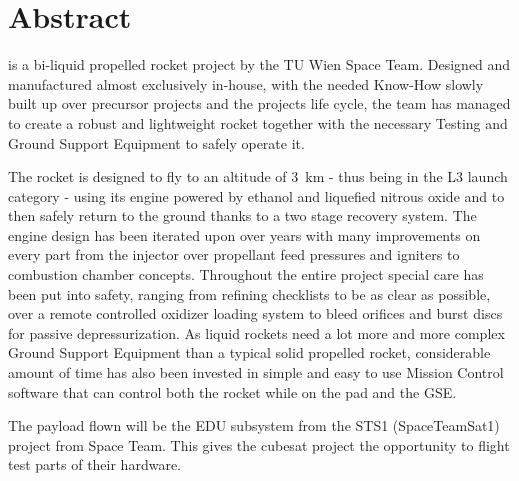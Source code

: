 \chapter{Abstract}
\label{chap:abstract}

\uH is a bi-liquid propelled rocket project by the TU Wien Space Team. Designed and manufactured almost exclusively in-house, with the needed Know-How slowly built up over precursor projects and the projects life cycle, the team has managed to create a robust and lightweight rocket together with the necessary Testing and Ground Support Equipment to safely operate it.

The rocket is designed to fly to an altitude of \SI{3}{\kilo\meter} - thus being in the L3 launch category - using its engine powered by ethanol and liquefied nitrous oxide and to then safely return to the ground thanks to a two stage recovery system. The engine design has been iterated upon over years with many improvements on every part from the injector over propellant feed pressures and igniters to combustion chamber concepts. Throughout the entire project special care has been put into safety, ranging from refining checklists to be as clear as possible, over a remote controlled oxidizer loading system to bleed orifices and burst discs for passive depressurization. As liquid rockets need a lot more and more complex Ground Support Equipment than a typical solid propelled rocket, considerable amount of time has also been invested in simple and easy to use Mission Control software that can control both the rocket while on the pad and the GSE.

The payload flown will be the EDU subsystem from the STS1 (SpaceTeamSat1) project from Space Team. This gives the cubesat project the opportunity to flight test parts of their hardware.
